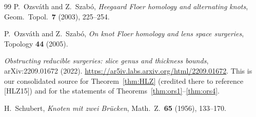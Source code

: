 \documentclass[11pt]{amsart}
\theoremstyle{definition}
\theoremstyle{remark}
\numberwithin{equation}{section}
\begin{document}
\begin{thebibliography}{99}
 P.~Ozsv\'ath and Z.~Szab\'o,
\emph{Heegaard Floer homology and alternating knots},
Geom.\ Topol.\ \textbf{7} (2003), 225--254.

 P.~Ozsv\'ath and Z.~Szab\'o,
\emph{On knot Floer homology and lens space surgeries},
Topology \textbf{44} (2005).

 \emph{Obstructing reducible surgeries: slice genus and
thickness bounds}, arXiv:2209.01672 (2022).
\url{https://ar5iv.labs.arxiv.org/html/2209.01672}. This is our
consolidated source for Theorem~\ref{thm:HLZ} (credited there to
reference [HLZ15]) and for the statements of
Theorems~\ref{thm:ors1}--\ref{thm:ors4}.

 H.~Schubert,
\emph{Knoten mit zwei Br\"ucken},
Math.\ Z.\ \textbf{65} (1956), 133--170.

\end{thebibliography}
\end{document}
